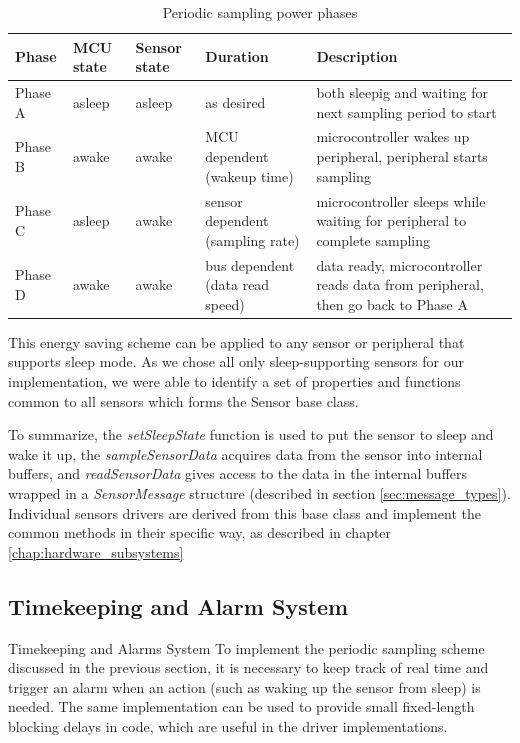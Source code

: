 \begin{table}
\centering
\begin{tabular}{|l|m{1.5cm}|m{1.5cm}|m{2.5cm}|m{4.5cm}|}
\hline
	\textbf{Phase}  &
	\textbf{MCU state}  &
	\bfseries Sensor state  &
	\textbf{Duration}  &
	\textbf{Description}  \\ 
\hline
	Phase A &
	asleep  &
	asleep  &
	as desired  &
	both sleepig and waiting for next sampling period to start  \\ 
\hline
	Phase B &
	awake  &
	awake  &
	MCU dependent (wakeup time)  &
	microcontroller wakes up peripheral, peripheral starts sampling  \\ 
\hline
	Phase C &
	asleep  &
	awake  &
	sensor dependent (sampling rate)  &
	microcontroller sleeps while waiting for peripheral to complete sampling  \\ 
\hline
	Phase D &
	awake  &
	awake  &
	bus dependent (data read speed)  &
	data ready, microcontroller reads data from peripheral, then go back to Phase A   \\ 
\hline 
\end{tabular}
\caption{Periodic sampling power phases}
\label{tab:power_phases} 
\end{table}

This energy saving scheme can be applied to any sensor or peripheral that supports sleep mode. As we chose all only sleep-supporting sensors for our implementation, we were able to identify a set of properties and functions common to all sensors which forms the Sensor base class.

To summarize, the \textit{setSleepState} function is used to put the sensor to sleep and wake it up, the \textit{sampleSensorData} acquires data from the sensor into internal buffers, and \textit{readSensorData} gives access to the data in the internal buffers wrapped in a \textit{SensorMessage} structure (described in section \ref{sec:message_types}). Individual sensors drivers are derived from this base class and implement the common methods in their specific way, as described in chapter \ref{chap:hardware_subsystems} 


\subsection{Timekeeping and Alarm System}
\label{sec:timekeeping}
Timekeeping and Alarms System
To implement the periodic sampling scheme discussed in the previous section, it is necessary to keep track of real time and trigger an alarm when an action (such as waking up the sensor from sleep) is needed. The same implementation can be used to provide small fixed-length blocking delays in code, which are useful in the driver implementations.

